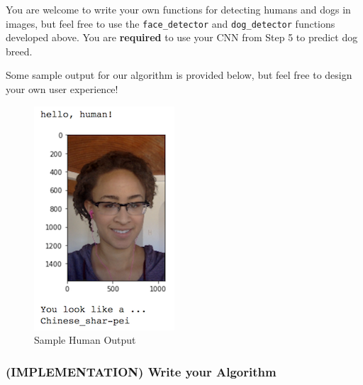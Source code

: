 \documentclass[11pt]{article}
\makeatletter
\def\maxwidth{\ifdim\Gin@nat@width>\linewidth\linewidth
    \else\Gin@nat@width\fi}
\let\Oldincludegraphics\includegraphics
\renewcommand{\includegraphics}[1]{\Oldincludegraphics[width=.8\maxwidth]{#1}}
\makeatother
\begin{document}
You are welcome to write your own functions for detecting humans and
dogs in images, but feel free to use the \texttt{face\_detector} and
\texttt{dog\_detector} functions developed above. You are
\textbf{required} to use your CNN from Step 5 to predict dog breed.

Some sample output for our algorithm is provided below, but feel free to
design your own user experience!

\begin{figure}
\centering
\includegraphics{images/sample_human_output.png}
\caption{Sample Human Output}
\end{figure}

\subsubsection{(IMPLEMENTATION) Write your
Algorithm}\label{implementation-write-your-algorithm}
\end{document}
